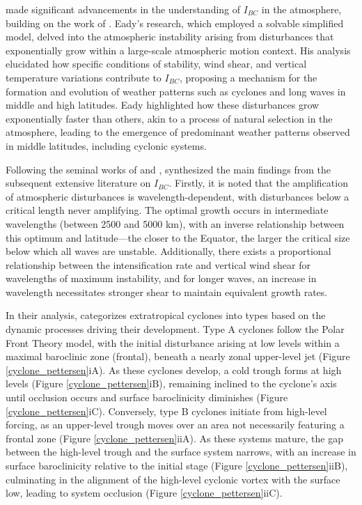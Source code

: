 \citet{eady1949long} made significant advancements in the understanding of \(I_{BC}\) in the atmosphere, building on the work of \citet{charney1947dynamics}. Eady's research, which employed a solvable simplified model, delved into the atmospheric instability arising from disturbances that exponentially grow within a large-scale atmospheric motion context. His analysis elucidated how specific conditions of stability, wind shear, and vertical temperature variations contribute to \(I_{BC}\), proposing a mechanism for the formation and evolution of weather patterns such as cyclones and long waves in middle and high latitudes. Eady highlighted how these disturbances grow exponentially faster than others, akin to a process of natural selection in the atmosphere, leading to the emergence of predominant weather patterns observed in middle latitudes, including cyclonic systems.

Following the seminal works of \citet{charney1947dynamics} and \citet{eady1949long}, \citet{palmen1969atmospheric} synthesized the main findings from the subsequent extensive literature on \(I_{BC}\). Firstly, it is noted that the amplification of atmospheric disturbances is wavelength-dependent, with disturbances below a critical length never amplifying. The optimal growth occurs in intermediate wavelengths (between 2500 and 5000 km), with an inverse relationship between this optimum and latitude—the closer to the Equator, the larger the critical size below which all waves are unstable. Additionally, there exists a proportional relationship between the intensification rate and vertical wind shear for wavelengths of maximum instability, and for longer waves, an increase in wavelength necessitates stronger shear to maintain equivalent growth rates.

In their analysis, \citet{petterssen1971development} categorizes extratropical cyclones into types based on the dynamic processes driving their development. Type A cyclones follow the Polar Front Theory model, with the initial disturbance arising at low levels within a maximal baroclinic zone (frontal), beneath a nearly zonal upper-level jet (Figure \ref{cyclone_pettersen}iA). As these cyclones develop, a cold trough forms at high levels (Figure \ref{cyclone_pettersen}iB), remaining inclined to the cyclone's axis until occlusion occurs and surface baroclinicity diminishes (Figure \ref{cyclone_pettersen}iC). Conversely, type B cyclones initiate from high-level forcing, as an upper-level trough moves over an area not necessarily featuring a frontal zone (Figure \ref{cyclone_pettersen}iiA). As these systems mature, the gap between the high-level trough and the surface system narrows, with an increase in surface baroclinicity relative to the initial stage (Figure \ref{cyclone_pettersen}iiB), culminating in the alignment of the high-level cyclonic vortex with the surface low, leading to system occlusion (Figure \ref{cyclone_pettersen}iiC).

